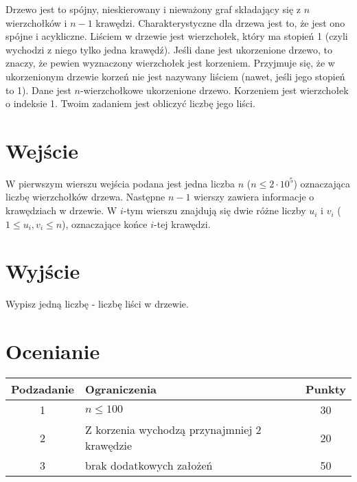 \documentclass{spiral}
\begin{document}
    \makeheader

    Drzewo jest to spójny, nieskierowany i nieważony graf
    składający się z $n$ wierzchołków i $n-1$ krawędzi.
    Charakterystyczne dla drzewa jest to, że jest ono spójne i acykliczne.
    Liściem w drzewie jest wierzchołek, który ma stopień 1
    (czyli wychodzi z niego tylko jedna krawędź).
    Jeśli dane jest ukorzenione drzewo, to znaczy,
    że pewien wyznaczony wierzchołek jest korzeniem.
    Przyjmuje się, że w ukorzenionym drzewie korzeń nie jest nazywany liściem
    (nawet, jeśli jego stopień to 1).
    Dane jest $n$-wierzchołkowe ukorzenione drzewo.
    Korzeniem jest wierzchołek o indeksie 1.  
    Twoim zadaniem jest obliczyć liczbę jego liści.

\section{Wejście}

    W pierwszym wierszu wejścia podana jest jedna liczba $n$ ($n \leq 2 \cdot 10^5$)
    oznaczająca liczbę wierzchołków drzewa.
    Następne $n-1$ wierszy zawiera informacje o krawędziach w drzewie.
    W $i$-tym wierszu znajdują się dwie różne liczby $u_i$ i $v_i$
    ($1 \leq u_i, v_i \leq n$), oznaczające końce $i$-tej krawędzi.

\section{Wyjście}

    Wypisz jedną liczbę - liczbę liści w drzewie.


\section{Ocenianie}

    \begin{center}
        \begin{tabular}{|c|p{5cm}|c|}
            \hline
            \textbf{Podzadanie} & \textbf{Ograniczenia} & \textbf{Punkty} \\
            \hline
            1 & $n \leq 100$ & 30 \\
            \hline
            2 & Z korzenia wychodzą przynajmniej 2 krawędzie & 20 \\
            \hline
            3 & brak dodatkowych założeń & 50 \\
            \hline
        \end{tabular}
    \end{center}
\end{document}

